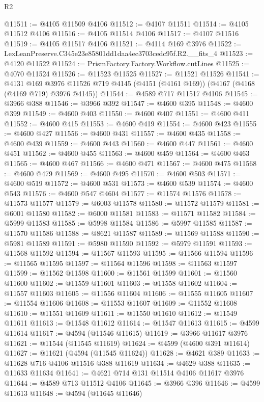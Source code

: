 \begin{lexlean}{R2}
\begin{coremodule}
@11511 := @4105 @11509 @4106
@11512 := @4107 @11511
@11514 := @4105 @11512 @4106
@11516 := @4105 @11514 @4106
@11517 := @4107 @11516
@11519 := @4105 @11517 @4106
@11521 := @4114 @169 @3976
@11522 := LexLeanPreserve.C345e23e85801dd1daa4ec3703cedc95f.R2.__fits_4
@11523 := @4120 @11522
@11524 := PrismFactory.Factory.Workflow.cutLines
@11525 := @4070 @11524
@11526 := @11523 @11525
@11527 := @11521 @11526
@11541 := @4131
    @169
    @3976
    @11526
    @719
    @4145
    (@4151 (@4161 @169))
    (@4167 (@4168 (@4169 @719) @3976 @4145))
@11544 := @4589 @717 @11517 @4106
@11545 := @3966 @388
@11546 := @3966 @392
@11547 := @4600 @395
@11548 := @4600 @399
@11549 := @4600 @403
@11550 := @4600 @407
@11551 := @4600 @411
@11552 := @4600 @415
@11553 := @4600 @419
@11554 := @4600 @423
@11555 := @4600 @427
@11556 := @4600 @431
@11557 := @4600 @435
@11558 := @4600 @439
@11559 := @4600 @443
@11560 := @4600 @447
@11561 := @4600 @451
@11562 := @4600 @455
@11563 := @4600 @459
@11564 := @4600 @463
@11565 := @4600 @467
@11566 := @4600 @471
@11567 := @4600 @475
@11568 := @4600 @479
@11569 := @4600 @495
@11570 := @4600 @503
@11571 := @4600 @519
@11572 := @4600 @531
@11573 := @4600 @539
@11574 := @4600 @543
@11576 := @4600 @547 @4604
@11577 := @11574 @11576
@11578 := @11573 @11577
@11579 := @6003 @11578
@11580 := @11572 @11579
@11581 := @6001 @11580
@11582 := @6000 @11581
@11583 := @11571 @11582
@11584 := @5999 @11583
@11585 := @5998 @11584
@11586 := @5997 @11585
@11587 := @11570 @11586
@11588 := @8621 @11587
@11589 := @11569 @11588
@11590 := @5981 @11589
@11591 := @5980 @11590
@11592 := @5979 @11591
@11593 := @11568 @11592
@11594 := @11567 @11593
@11595 := @11566 @11594
@11596 := @11565 @11595
@11597 := @11564 @11596
@11598 := @11563 @11597
@11599 := @11562 @11598
@11600 := @11561 @11599
@11601 := @11560 @11600
@11602 := @11559 @11601
@11603 := @11558 @11602
@11604 := @11557 @11603
@11605 := @11556 @11604
@11606 := @11555 @11605
@11607 := @11554 @11606
@11608 := @11553 @11607
@11609 := @11552 @11608
@11610 := @11551 @11609
@11611 := @11550 @11610
@11612 := @11549 @11611
@11613 := @11548 @11612
@11614 := @11547 @11613
@11615 := @4599 @11614
@11617 := @4594 (@11546 @11615)
@11619 := @3966 @11617 @3976
@11621 := @11544 (@11545 @11619)
@11624 := @4599 (@4600 @391 @11614)
@11627 := @11621 (@4594 (@11545 @11624))
@11628 := @4621 @389
@11633 := @11628 @716 @4106 @11516 @388 @11619
@11634 := @4629 @388
@11635 := @11633 @11634
@11641 := @4621 @714 @131 @11514 @4106 @11617 @3976
@11644 := @4589 @713 @11512 @4106
@11645 := @3966 @396
@11646 := @4599 @11613
@11648 := @4594 (@11645 @11646)

\end{coremodule}
\end{lexlean}
